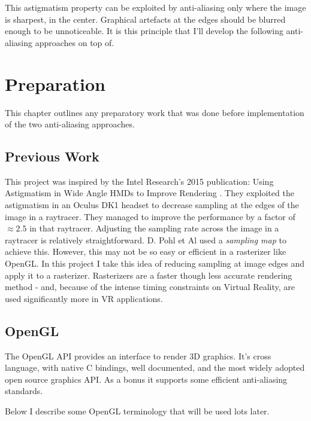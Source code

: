 \documentclass[12pt,a4paper,twoside,openright]{report}
\begin{document}
This astigmatism property can be exploited by anti-aliasing only where the image is sharpest, in the center. Graphical artefacts at the edges should be blurred enough to be unnoticeable. It is this principle that I'll develop the following anti-aliasing approaches on top of.

\chapter{Preparation}

This chapter outlines any preparatory work that was done before implementation of the two anti-aliasing approaches.

\section{Previous Work}

This project was inspired by the Intel Research's 2015 publication: Using Astigmatism in Wide Angle HMDs to Improve Rendering \cite{Astigpap}. They exploited the astigmatism in an Oculus DK1 headset to decrease sampling at the edges of the image in a raytracer. They managed to improve the performance by a factor of $\approx 2.5$ in that raytracer.
Adjusting the sampling rate across the image in a raytracer is relatively straightforward. D. Pohl et Al used a \emph{sampling map} to achieve this. However, this may not be so easy or efficient in a rasterizer like OpenGL. In this project I take this idea of reducing sampling at image edges and apply it to a rasterizer. Rasterizers are a faster though less accurate rendering method - and, because of the intense timing constraints on Virtual Reality, are used significantly more in VR applications. 

\section{OpenGL}

The OpenGL API provides an interface to render 3D graphics. It's cross language, with native C bindings, well documented, and the most widely adopted open source graphics API. As a bonus it supports some efficient anti-aliasing standards.

Below I describe some OpenGL terminology that will be used lots later.
\end{document}
